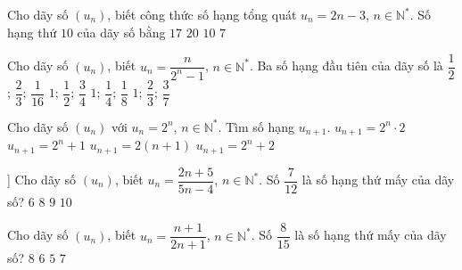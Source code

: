 

\begin{ex}%
	Cho dãy số  $\left(u_n \right)$, biết công thức số hạng tổng quát $u_n=2n-3$, $n\in\mathbb{N}^*$. Số hạng thứ $10$ của dãy số bằng
	\choice 
		 {\True $17$}
		 {$20$}
		{$10$} 
		 {$7$}
\end{ex}

\begin{ex}%
	Cho dãy số $\left(u_n\right)$, biết $u_n=\dfrac{n}{2^n-1 }$, $n\in\mathbb{N}^{*}$. Ba số  hạng đầu tiên của dãy số là
	 \choice
		{$\dfrac{1}{2}$;  $\dfrac{2}{3}$; $\dfrac{1}{16}$}
		 {$1$; $\dfrac{1}{2}$; $\dfrac{3}{4}$}
		{$1$; $\dfrac{1}{4}$;  $\dfrac{1}{8}$}
		{\True $1$;  $\dfrac{2}{3}$; $\dfrac{3}{7}$}
\end{ex}

\begin{ex}%
	Cho  dãy số $\left(u_n \right)$ với $u_n=2^n$, $n\in \mathbb{N}^{*}$. Tìm số hạng $u_{n+1}$.
	 \choice
		{\True  $u_{n+1}=2^n\cdot2$}
		 {$u_{n+1}=2^n+1$}
		{$u_{n+1}=2\left(n+1\right)$} 
		 {$u_{n+1}=2^n+2$}
\end{ex}

\begin{ex}%
	 ]
	Cho dãy số $\left(u_n \right)$, biết $u_n=\dfrac{2n+5}{5n-4}$, $n\in \mathbb{N}^{*}$. Số $\dfrac{7}{12}$ là  số hạng thứ mấy của dãy số?
	\choice 
		 {$6$}
		{\True $8$} 
		 {$9$}
		 {$10$}
\end{ex}

\begin{ex}%
	Cho dãy số  $\left(u_n \right)$, biết $u_n=\dfrac{n+1}{2n+1}$, $n\in \mathbb{N}^{*}$. Số $\dfrac{8}{15}$ là số hạng thứ mấy của dãy số?
	\choice 
		 {$8$}
		{$6$} 
		{$5$} 
		{\True  $7$}
\end{ex}

